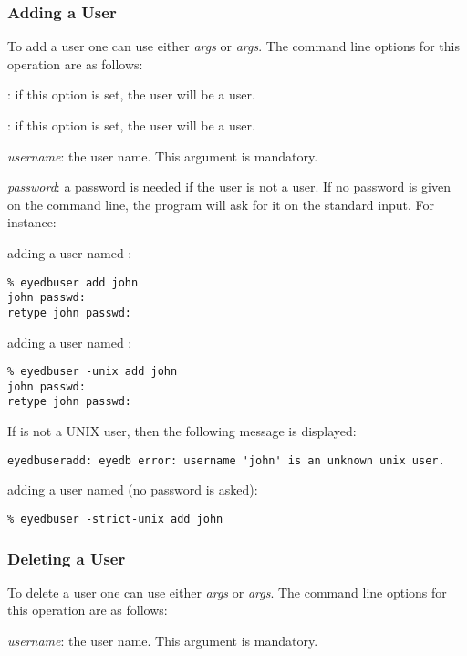 \subsubsection{Adding a User}
To add a user one can use either  \emph{args}
or  \emph{args}.
The command line options for this operation are as follows:
\bi
\item {}: if this option is set, the user will be a
 user.
\item {}:
if this option is set, the user will be a
 user.
\item \emph{username}: the user name. This argument is mandatory.
\item \emph{password}: a password is needed if the user is not
a  user. If no password is given on
the command line, the program will ask for it on the standard input.
\ei
For instance:
\bi
\item adding a  user named :
\verbsize
\begin{verbatim}
% eyedbuser add john
john passwd:
retype john passwd:
\end{verbatim}
\normalsize
\item adding a  user named :
\verbsize
\begin{verbatim}
% eyedbuser -unix add john
john passwd:
retype john passwd:
\end{verbatim}
\normalsize
If  is not a UNIX user, then the following message is displayed:
\verbsize
\begin{verbatim}
eyedbuseradd: eyedb error: username 'john' is an unknown unix user.
\end{verbatim}
\normalsize
\item adding a  user named  (no password
is asked):
\verbsize
\begin{verbatim}
% eyedbuser -strict-unix add john
\end{verbatim}
\normalsize
\ei
\subsubsection{Deleting a User}
To delete a user one can use either  \emph{args}
or  \emph{args}.
The command line options for this operation are as follows:
\bi
\item \emph{username}: the user name. This argument is mandatory.
\ei
